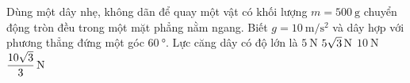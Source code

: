 \begin{ex}
Dùng một dây nhẹ, không dãn để quay một vật có khối lượng $m=\SI{500}{\gram}$ chuyển động tròn đều trong một mặt phẳng nằm ngang. Biết $g =\SI{10}{\meter/\second^2}$ và dây hợp với phương thẳng đứng một góc $\SI{60}{\degree}$. Lực căng dây có độ lớn là	
	\choice
	{$\SI{5}{\newton}$}
	{$\xsi{5\sqrt{3}}{\newton}$}
	{\True $\SI{10}{\newton}$}
	{$\xsi{\dfrac{10\sqrt{3}}{3}}{\newton}$}
\end{ex}
